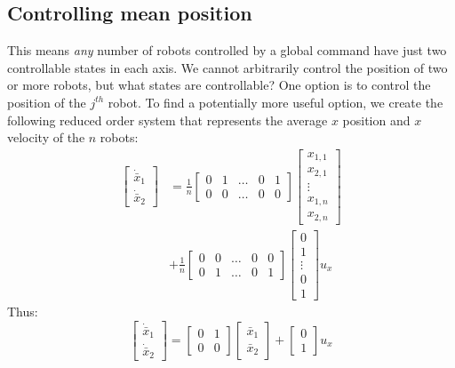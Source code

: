 \subsection{Controlling mean position}\label{sec:controlMeanPosition}
This means \emph{any} number of robots controlled by a global command have just two controllable states in each axis. We cannot arbitrarily control the position of two or more robots, but what states are controllable? One option is to control the position of the $j^{th}$ robot. To find a potentially more useful option, we create the following reduced order system that represents the average $x$ position and $x$ velocity of the $n$ robots:
\begin{align}
\begin{bmatrix}\nonumber
\dot{\bar{x}}_1 \\
\dot{\bar{x}}_2
\end{bmatrix} &= \frac{1}{n} \begin{bmatrix}
0& 1& \ldots &0& 1 \\
0& 0& \ldots &0& 0
\end{bmatrix}
\begin{bmatrix}
x_{1,1}\\
x_{2,1}\\
\vdots\\
x_{1,n}\\
x_{2,n}
\end{bmatrix} \\
&+ \frac{1}{n}\begin{bmatrix}
0& 0&  \ldots &0& 0 \\
0& 1&  \ldots &0& 1
\end{bmatrix}\begin{bmatrix} 
0\\
1\\
\vdots\\
0\\
1
\end{bmatrix} u_x
\end{align}
Thus:
\begin{equation}
\begin{bmatrix}
\dot{\bar{x}}_1 \\
\dot{\bar{x}}_2
\end{bmatrix} = \begin{bmatrix}
0& 1 \\
0& 0
\end{bmatrix}
\begin{bmatrix}
\bar{x}_1\\
\bar{x}_2
\end{bmatrix} + \begin{bmatrix} 
0\\
1
\end{bmatrix} u_x
\end{equation}

